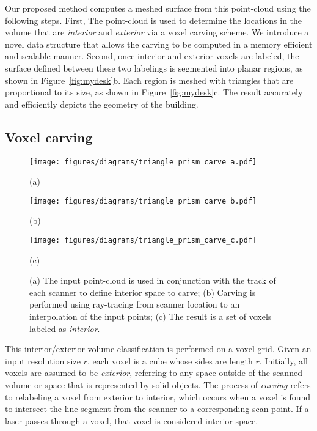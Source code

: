 \documentclass[10pt,twocolumn,letterpaper]{article}
\begin{document}
Our proposed method computes a meshed surface from this point-cloud using the following steps.  First, The point-cloud is used to determine the locations in the volume that are {\it interior} and {\it exterior} via a voxel carving scheme.  We introduce a novel data structure that allows the carving to be computed in a memory efficient and scalable manner.  Second, once interior and exterior voxels are labeled, the surface defined between these two labelings is segmented into planar regions, as shown in Figure~\ref{fig:mydesk}b.  Each region is meshed with triangles that are proportional to its size, as shown in Figure~\ref{fig:mydesk}c.  The result accurately and efficiently depicts the geometry of the building.

\subsection{Voxel carving}
\label{sec:carving}

\begin{figure*}[t]

  \begin{minipage}[b]{0.3\linewidth}
  \centerline{\texttt{[image: figures/diagrams/triangle\_prism\_carve\_a.pdf]}}
  \centerline{(a)}\medskip
  \end{minipage}
  \begin{minipage}[b]{0.3\linewidth}
  \centerline{\texttt{[image: figures/diagrams/triangle\_prism\_carve\_b.pdf]}}
  \centerline{(b)}\medskip
  \end{minipage}
  \begin{minipage}[b]{0.3\linewidth}
  \centerline{\texttt{[image: figures/diagrams/triangle\_prism\_carve\_c.pdf]}}
  \centerline{(c)}\medskip
  \end{minipage}

\caption{(a) The input point-cloud is used in conjunction with the track of each scanner to define interior space to carve; (b) Carving is performed using ray-tracing from scanner location to an interpolation of the input points; (c) The result is a set of voxels labeled as {\it interior}.}
\label{fig:carving}
\end{figure*}

This interior/exterior volume classification is performed on a voxel grid.  Given an input resolution size $r$, each voxel is a cube whose sides are length $r$.  Initially, all voxels are assumed to be {\it exterior}, referring to any space outside of the scanned volume or space that is represented by solid objects.  The process of {\it carving} refers to relabeling a voxel from exterior to interior, which occurs when a voxel is found to intersect the line segment from the scanner to a corresponding scan point.  If a laser passes through a voxel, that voxel is considered interior space.
\end{document}
